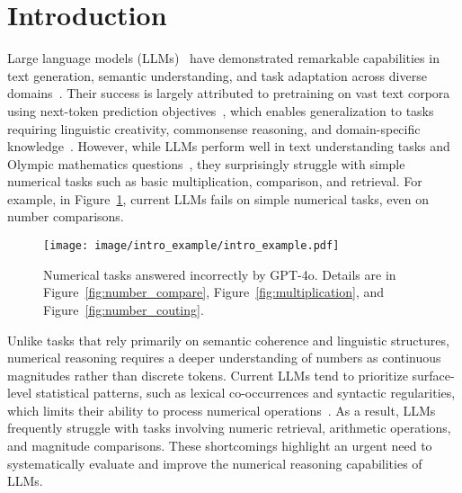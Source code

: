 \section{Introduction}
Large language models (LLMs)~\citep{zhao2024surveylargelanguagemodels} 
have demonstrated remarkable capabilities in text generation, semantic understanding, and task adaptation across diverse domains~\citep{ling2024domainspecializationkeymake}. 
Their success is largely attributed to pretraining on vast text corpora using next-token prediction objectives~\citep{he2024lawnexttokenpredictionlarge}, which enables generalization to tasks requiring linguistic creativity, commonsense reasoning, and domain-specific knowledge~\citep{ye-2024-cross}.
However, while LLMs perform well  in text understanding tasks and Olympic mathematics questions~\cite{team2024gemini}, 
they surprisingly struggle with simple numerical tasks such as basic multiplication, comparison, and retrieval. 
For example,  in Figure~\ref{fig:intro_example},
current LLMs fails on simple numerical tasks, even on number comparisons.


\begin{figure}[t]
	\centering	
 	\vspace{-1em}
	
	\texttt{[image: image/intro\_example/intro\_example.pdf]}
	\caption{Numerical tasks answered incorrectly by GPT-4o. Details are in Figure~\ref{fig:number_compare},  Figure~\ref{fig:multiplication}, and Figure~\ref{fig:number_couting}.}
	
	
	\label{fig:intro_example}
	\vspace{-1em}
\end{figure}

 


Unlike tasks that rely primarily on semantic coherence and linguistic structures, 
numerical reasoning requires a deeper understanding of numbers as continuous magnitudes rather than discrete tokens. 
Current LLMs tend to prioritize surface-level statistical patterns, 
such as lexical co-occurrences and syntactic regularities, which limits their ability to process  numerical operations~\citep{ahn2024largelanguagemodelsmathematical,feng2024numerical,zhou2024transformers}.
As a result, LLMs frequently struggle with tasks involving numeric retrieval, arithmetic operations, 
and magnitude comparisons. These shortcomings highlight an urgent need to systematically evaluate and improve the numerical reasoning capabilities of LLMs.

 


